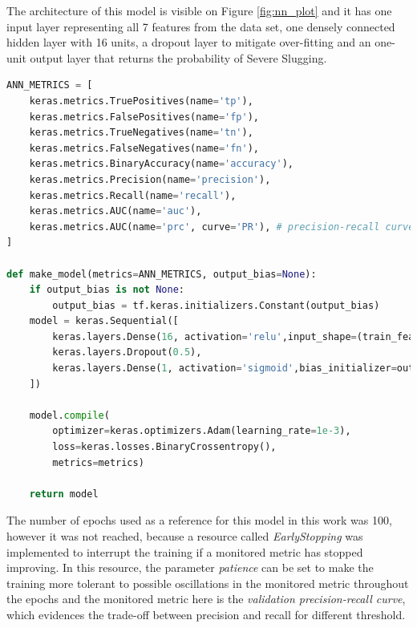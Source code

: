 \documentclass{article}
\begin{document}
The architecture of this model is visible on Figure \ref{fig:nn_plot} and it has one input layer representing all 7 features from the data set, one densely connected hidden layer with 16 units, a dropout layer to mitigate over-fitting and an one-unit output layer that returns the probability of Severe Slugging.

\begin{lstlisting}[language=Python]
ANN_METRICS = [
    keras.metrics.TruePositives(name='tp'),
    keras.metrics.FalsePositives(name='fp'),
    keras.metrics.TrueNegatives(name='tn'),
    keras.metrics.FalseNegatives(name='fn'), 
    keras.metrics.BinaryAccuracy(name='accuracy'),
    keras.metrics.Precision(name='precision'),
    keras.metrics.Recall(name='recall'),
    keras.metrics.AUC(name='auc'),
    keras.metrics.AUC(name='prc', curve='PR'), # precision-recall curve
]

def make_model(metrics=ANN_METRICS, output_bias=None):
    if output_bias is not None:
        output_bias = tf.keras.initializers.Constant(output_bias)
    model = keras.Sequential([
        keras.layers.Dense(16, activation='relu',input_shape=(train_features.shape[-1],)),
        keras.layers.Dropout(0.5),
        keras.layers.Dense(1, activation='sigmoid',bias_initializer=output_bias),
    ])

    model.compile(
        optimizer=keras.optimizers.Adam(learning_rate=1e-3),
        loss=keras.losses.BinaryCrossentropy(),
        metrics=metrics)

    return model
\end{lstlisting}

The number of epochs used as a reference for this model in this work was 100, however it was not reached, because a resource called \emph{EarlyStopping} was implemented to interrupt the training if a monitored metric has stopped improving. In this resource, the parameter \emph{patience} can be set to make the training more tolerant to possible oscillations in the monitored metric throughout the epochs and the monitored metric here is the \emph{validation precision-recall curve}, which evidences the trade-off between precision and recall for different threshold.
\end{document}
